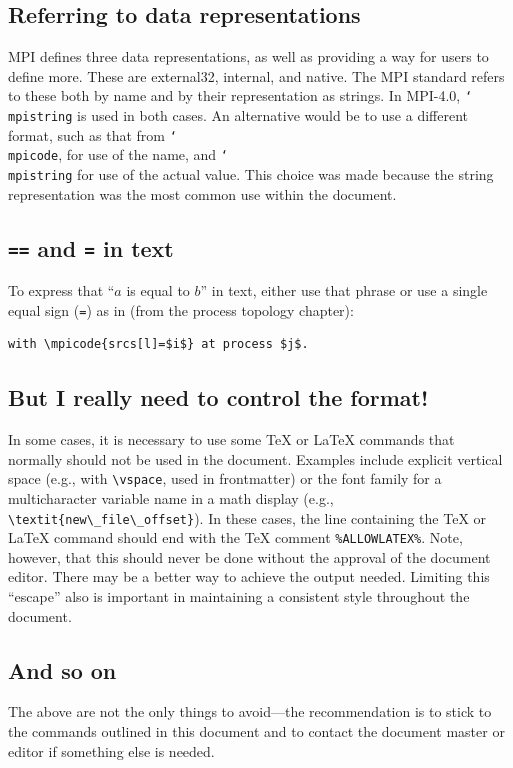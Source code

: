 \documentclass[letterpaper,twoside,11pt,fleqn]{article}
\def\cmd#1{\texttt{\char`\\#1}}
\def\MPI/{\textsf{MPI}}    %
\begin{document}
\subsection{Referring to data representations}
\MPI/ defines three data representations, as well as providing a way
for users to define more.  These are external32, internal, and
native.
The \MPI/ standard refers to these both by name and by their
representation as strings.
In \MPI/-4.0, \cmd{mpistring} is used in both cases.
An alternative would be to use a different format, such as that from
\cmd{mpicode}, for use of the name, and \cmd{mpistring} for use of the
actual value.
This choice was made because the string representation was the most
common use within the document.

\subsection{\texttt{==} and \texttt{=} in text}
To express that ``$a$ is equal to $b$'' in text, either use that
phrase or use a single equal sign (\texttt{=}) as in (from the process
topology chapter):
\begin{verbatim}
with \mpicode{srcs[l]=$i$} at process $j$.
\end{verbatim}

\subsection{But I really need to control the format!}
In some cases, it is necessary to use some TeX or LaTeX commands that
normally should not be used in the document.
Examples include explicit vertical space (e.g., with \verb+\vspace+,
used in frontmatter) or the font family for a multicharacter variable
name in a math display (e.g., \verb+\textit{new\_file\_offset}+).
In these cases, the line containing the TeX or LaTeX command should
end with the TeX comment \verb+%ALLOWLATEX%+.
Note, however, that this should never be done without the approval of
the document editor.
There may be a better way to achieve the output needed.
Limiting this ``escape'' also is important in maintaining a consistent
style throughout the document.

\subsection{And so on}
The above are not the only things to avoid---the recommendation is
to stick to the commands outlined in this document and to contact the
document master or editor if something else is needed.
\end{document}
